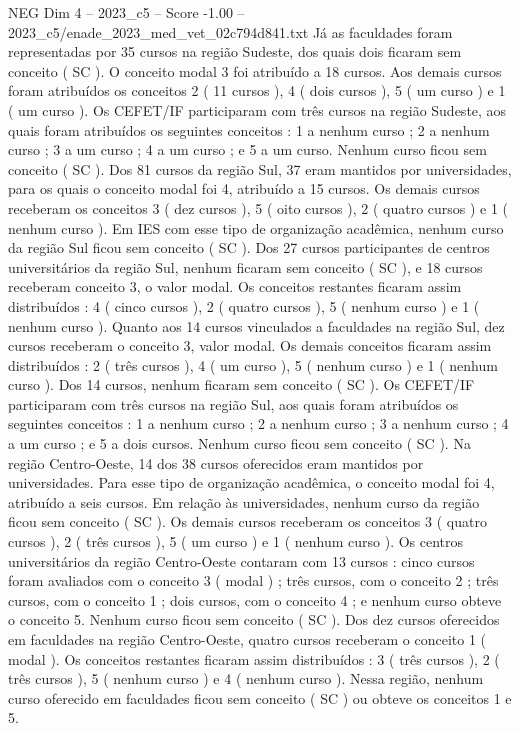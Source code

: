 \begin{textsample}{NEG Dim 4 – 2023\_c5 – Score -1.00 – 2023\_c5/enade\_2023\_med\_vet\_02c794d841.txt}
Já as faculdades foram representadas por 35 cursos na região Sudeste, dos quais dois ficaram sem conceito ( SC ).
O conceito modal 3 foi atribuído a 18 cursos.
Aos demais cursos foram atribuídos os conceitos 2 ( 11 cursos ), 4 ( dois cursos ), 5 ( um curso ) e 1 ( um curso ).
Os CEFET/IF participaram com três cursos na região Sudeste, aos quais foram atribuídos os seguintes conceitos : 1 a nenhum curso ; 2 a nenhum curso ; 3 a um curso ; 4 a um curso ; e 5 a um curso.
Nenhum curso ficou sem conceito ( SC ).
Dos 81 cursos da região Sul, 37 eram mantidos por universidades, para os quais o conceito modal foi 4, atribuído a 15 cursos.
Os demais cursos receberam os conceitos 3 ( dez cursos ), 5 ( oito cursos ), 2 ( quatro cursos ) e 1 ( nenhum curso ).
Em IES com esse tipo de organização acadêmica, nenhum curso da região Sul ficou sem conceito ( SC ).
Dos 27 cursos participantes de centros universitários da região Sul, nenhum ficaram sem conceito ( SC ), e 18 cursos receberam conceito 3, o valor modal.
Os conceitos restantes ficaram assim distribuídos : 4 ( cinco cursos ), 2 ( quatro cursos ), 5 ( nenhum curso ) e 1 ( nenhum curso ).
Quanto aos 14 cursos vinculados a faculdades na região Sul, dez cursos receberam o conceito 3, valor modal.
Os demais conceitos ficaram assim distribuídos : 2 ( três cursos ), 4 ( um curso ), 5 ( nenhum curso ) e 1 ( nenhum curso ).
Dos 14 cursos, nenhum ficaram sem conceito ( SC ).
Os CEFET/IF participaram com três cursos na região Sul, aos quais foram atribuídos os seguintes conceitos : 1 a nenhum curso ; 2 a nenhum curso ; 3 a nenhum curso ; 4 a um curso ; e 5 a dois cursos.
Nenhum curso ficou sem conceito ( SC ).
Na região Centro-Oeste, 14 dos 38 cursos oferecidos eram mantidos por universidades.
Para esse tipo de organização acadêmica, o conceito modal foi 4, atribuído a seis cursos.
Em relação às universidades, nenhum curso da região ficou sem conceito ( SC ).
Os demais cursos receberam os conceitos 3 ( quatro cursos ), 2 ( três cursos ), 5 ( um curso ) e 1 ( nenhum curso ).
Os centros universitários da região Centro-Oeste contaram com 13 cursos : cinco cursos foram avaliados com o conceito 3 ( modal ) ; três cursos, com o conceito 2 ; três cursos, com o conceito 1 ; dois cursos, com o conceito 4 ; e nenhum curso obteve o conceito 5.
Nenhum curso ficou sem conceito ( SC ).
Dos dez cursos oferecidos em faculdades na região Centro-Oeste, quatro cursos receberam o conceito 1 ( modal ).
Os conceitos restantes ficaram assim distribuídos : 3 ( três cursos ), 2 ( três cursos ), 5 ( nenhum curso ) e 4 ( nenhum curso ).
Nessa região, nenhum curso oferecido em faculdades ficou sem conceito ( SC ) ou obteve os conceitos 1 e 5.

\end{textsample}
